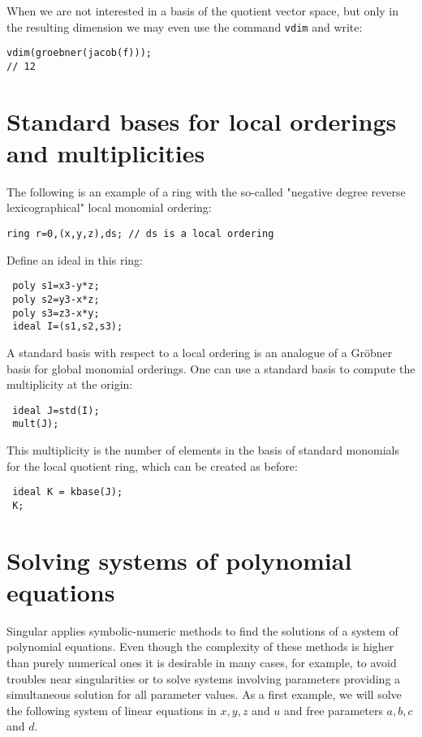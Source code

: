 \documentclass[12pt]{amsart}
\begin{document}
When we are not interested in a basis of the quotient vector space, but only in the resulting dimension we may 
even use the command \texttt{vdim} and write:

\begin{verbatim}
vdim(groebner(jacob(f)));
// 12
\end{verbatim}


\section{Standard bases for local orderings and multiplicities}

The following is an example of a ring with the so-called "negative degree reverse lexicographical" local monomial ordering:

\begin{verbatim}
ring r=0,(x,y,z),ds; // ds is a local ordering
\end{verbatim}


Define an ideal in this ring:

\begin{verbatim}
 poly s1=x3-y*z;
 poly s2=y3-x*z;
 poly s3=z3-x*y;
 ideal I=(s1,s2,s3);
\end{verbatim}

A standard basis with respect to a local ordering is an analogue of a Gr\"obner basis for global monomial orderings.
One can use a standard basis to compute the multiplicity at the origin:

\begin{verbatim}
 ideal J=std(I);
 mult(J); 
\end{verbatim}

This multiplicity is the number of elements in the basis of standard monomials for the local quotient ring,
 which can be created as before:

\begin{verbatim}
 ideal K = kbase(J);
 K; 
\end{verbatim}
 

\section{Solving systems of polynomial equations}

Singular applies symbolic-numeric methods to find the solutions of a system of polynomial equations. 
Even though the complexity of these methods is higher than purely numerical ones it is desirable in many 
cases, for example, to avoid troubles near singularities or to solve systems involving parameters providing
a simultaneous solution for all parameter values. As a first example, we will solve the following 
system of linear equations in $x,y,z$ and $u$ and free parameters $a,b,c$ and $d$.  
\end{document}
